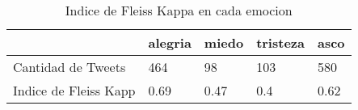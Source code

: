 \begin{table}
\caption{Indice de Fleiss Kappa en cada emocion}
\label{table:agreements}
\centering
\begin{tabular}{lllll}
\toprule
 & alegria & miedo & tristeza & asco \\
\midrule
Cantidad de Tweets & 464 & 98 & 103 & 580 \\
Indice de Fleiss Kapp & 0.69 & 0.47 & 0.4 & 0.62 \\
\bottomrule
\end{tabular}
\end{table}
